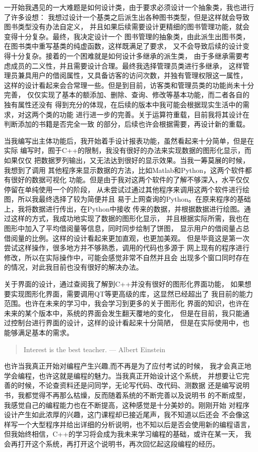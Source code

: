 \documentclass[12pt,twoside]{ctexart}
\begin{document}
一开始我遇见的一大难题是如何设计类，由于要求必须设计一个抽象类，我也进行了许多设想：
我想过设计一个基类之后派生出各种图书类型，但是这样就会导致图书类型没有办法自定义，
并且如果后续需要设计更精细的图书管理功能，就会变得十分复杂。最终，我决定设计一个
图书管理的抽象类，由此派生出图书类，在图书类中重写基类的纯虚函数，这样既满足了要求，
又不会导致后续的设计变得十分复杂。接着的一个困难就是如何设计多继承的派生类，
由于多继承需要考虑成员的二义性，并且需要设计合理。最终我选择管理员类进行多继承，
这样管理员兼具用户的借阅属性，又具备访客的访问次数，并独有管理权限这一属性，
这样的设计看起来会合常理一些。但是到目前，访客类和管理员类的功能尚未十分完善，
仅仅实现了基本的额添加、删除、查询、修改等基本功能，而二者各自的独有属性还没有
得到充分的体现，在后续的版本中我可能会根据现实生活中的需求，对这两个类的功能
进行进一步的完善。关于运算符重载，目前我将其设计在判断添加的书籍是否完全一致
的部分，后续也许会根据需要，再设计新的重载。

当我编写出主体功能后，我开始着手设计报表功能，虽然看起来十分简单，但是在实际
编写时，囿于C++的限制，我没有很好的办法来实现数据的图形化显示，而如果仅仅
把数据罗列输出，又无法达到很好的显示效果。当我一筹莫展的时候，我想到了调用
其他程序来显示数据的方法，比如Matlab和Python，这两个软件都有很好的数据可视化
功能。但是由于我对这两个软件的了解不够深入，水平仅仅停留在单纯使用一个的阶段，
从未尝试过通过其他程序来调用这两个软件进行绘图，所以我最终选择了较为简便并且
易于上网查询的Python。在原来程序的基础上，我将数据进行传出，在Python中接收
传来的数据，并根据数据进行绘图。通过这样的方式，我成功地实现了数据的图形化显示，
并且根据实际所需，我也在图形中加入了平均借阅量等信息，同时同步绘制了饼图，
显示用户的借阅量占总借阅量的比例。这样的设计看起来更加直观，也更加美观。
但是毕竟这是第一次尝试这样操作，很多地方并不够熟悉，调用的代码也多源于
网上现有的程序进行修改，所以在实际操作中，可能会感觉非常不自然并且会
出现多个窗口同时存在的情况，对此我目前也没有很好的解决办法。

关于界面的设计，通过查阅我了解到C++并没有很好的图形化界面功能，
如果想要实现图形化界面，需要调用QT等更高级的库，这显然已经超出了
我目前的能力范围。也许在未来的学习中，我会学习到更多的关于图形化
界面的知识，也许在未来的某个版本中，系统的界面会发生翻天覆地的变化，
但是在目前，我只能通过控制台进行界面的设计，这样的设计看起来十分简陋，
但是在实际使用中，也能够满足基本的需求。


\begin{quotation}
    Interest is the best teacher. --- Albert Einstein
\end{quotation}

也许当我真正开始对编程产生兴趣,而不再是为了应付考试的时候，
我才会真正地学会编程，也许这就是编程的魅力。当我真正开始设计这个系统，
并想要让它完善的时候，不论查资料还是问同学，无论写代码、改代码、测数据
还是编写说明书，我都觉得不再那么枯燥，反而随着系统的不断完善以及说明书
的不断成型，我感觉自己的编程能力也在不断提高，这种感觉是十分美妙的。刚刚开始
对程序设计产生如此浓厚的兴趣，这门课程却已接近尾声，我不知道以后还会
不会像这样写一个大型程序并给出详细的分析说明，也不知以后是否会使用新的编程语言，
但我始终相信，C++的学习将会成为我未来学习编程的基础，或许在某一天，
我会再打开这个系统，再打开这个说明书，再次回忆起这段编程的经历。
\end{document}
